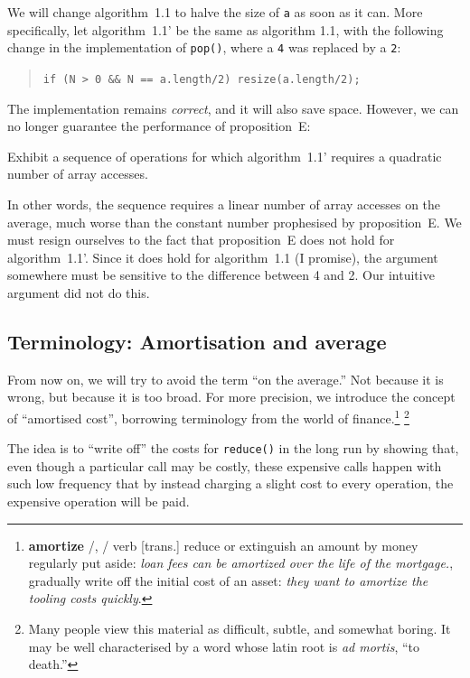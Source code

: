 \documentclass{tufte-handout}
\begin{document}
We will change algorithm~1.1 to halve the size of {\tt a} as soon as
it can.  
More specifically, let algorithm~1.1' be the same as algorithm 1.1,
with the following change in the implementation of {\tt pop()}, where
a {\tt 4} was replaced by a {\tt 2}:

\begin{quote}
  {\tt if (N > 0 \&\& N == a.length/2) resize(a.length/2);}
\end{quote}
   
The implementation remains \emph{correct}, and it will also save
space. 
However, we can no longer guarantee the performance of proposition~E:

\begin{ExerciseList}\small
  \Exercise Exhibit a sequence of operations for which
  algorithm~1.1' requires a quadratic number of array accesses.
\end{ExerciseList}

In other words, the sequence requires a linear number of array
accesses on the average, much worse than the constant number
prophesised by proposition~E. 
We must resign ourselves to the fact that proposition~E does not hold
for algorithm~1.1'.
Since it does hold for algorithm~1.1 (I promise), the argument
somewhere must be sensitive to the difference between 4 and 2.
Our intuitive argument did not do this.

\subsection{Terminology: Amortisation and average}

From now on, we will try to avoid the term ``on the average.'' 
Not because it is wrong, but because it is too broad.
For more precision, we introduce the concept of ``amortised cost'',
borrowing terminology from the world of finance.\footnote{
{\bf amortize} 
/, /
verb [trans.]
reduce or extinguish an amount by money regularly put aside:
\emph{loan fees can be amortized over the life of the mortgage.}, gradually write off the initial cost of an asset: \emph{they want to amortize the tooling costs quickly}.
}
\footnote{Many people view this material as  difficult, subtle, and somewhat
boring. It may be well
characterised by a word whose latin root is \emph{ad mortis}, ``to death.''}

The idea is to ``write off'' the costs for {\tt reduce()} in the long
run by showing that, even though a particular call may be costly,
these expensive calls happen with such low frequency that by instead
charging a slight cost to every operation, the expensive operation
will be paid.
\end{document}
